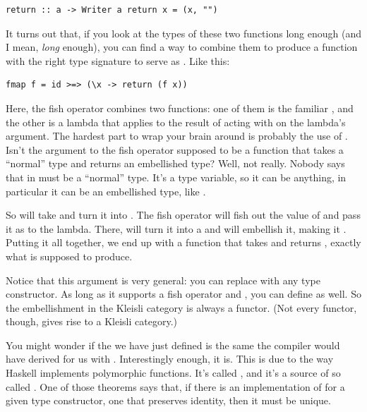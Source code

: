 \begin{verbatim}
return :: a -> Writer a return x = (x, "")
\end{verbatim}
It turns out that, if you look at the types of these two functions long
enough (and I mean, \emph{long} enough), you can find a way to combine
them to produce a function with the right type signature to serve as
. Like this:

\begin{verbatim}
fmap f = id >=> (\x -> return (f x))
\end{verbatim}
Here, the fish operator combines two functions: one of them is the
familiar , and the other is a lambda that applies
 to the result of acting with  on the lambda's
argument. The hardest part to wrap your brain around is probably the use
of . Isn't the argument to the fish operator supposed to be a
function that takes a ``normal'' type and returns an embellished type?
Well, not really. Nobody says that  in
 must be a ``normal'' type. It's a
type variable, so it can be anything, in particular it can be an
embellished type, like .

So  will take  and turn it into
. The fish operator will fish out the value of
 and pass it as  to the lambda. There, 
will turn it into a  and  will embellish it,
making it . Putting it all together, we end up with a
function that takes  and returns ,
exactly what  is supposed to produce.

Notice that this argument is very general: you can replace
 with any type constructor. As long as it supports a fish
operator and , you can define  as well. So
the embellishment in the Kleisli category is always a functor. (Not
every functor, though, gives rise to a Kleisli category.)

You might wonder if the  we have just defined is the same
 the compiler would have derived for us with
. Interestingly enough, it is. This is due to
the way Haskell implements polymorphic functions. It's called
, and it's a source of so called
. One of those theorems says that, if there is
an implementation of  for a given type constructor, one
that preserves identity, then it must be unique.

